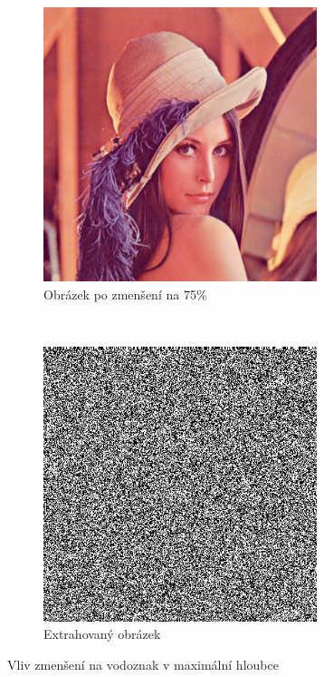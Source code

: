 \begin{figure}[h!]
    \begin{center}
        \begin{subfigure}[t]{0.5\textwidth}
            \centering
            \includegraphics[height=8cm]{images/resize_7_75percent.jpg}
            \caption{Obrázek po zmenšení na 75\%}
        \end{subfigure}%
        ~
        \begin{subfigure}[t]{0.5\textwidth}
            \centering
            \includegraphics[height=8cm]{images/resize_7_75percent_extracted.jpg}
            \caption{Extrahovaný obrázek}
        \end{subfigure}
        \caption{Vliv zmenšení na vodoznak v maximální hloubce}
    \end{center}
\end{figure}

